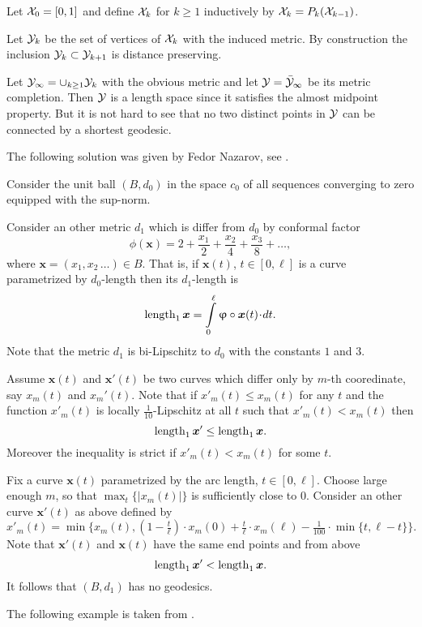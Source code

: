 Let $\mathcal{X}_0=[0,1]$ and define $\mathcal{X}_k$ for $k\ge 1$ inductively by $\mathcal{X}_k=P_k(\mathcal{X}_{k-1})$.

Let $\mathcal{Y}_k$ be the set of vertices of $\mathcal{X}_k$ with the induced metric. By construction the inclusion $\spc{Y}_k\subset \spc{Y}_{k+1}$ is distance preserving.

Let $\spc{Y}_\infty=\cup_{k\ge 1}\spc{Y}_k$ with the obvious metric and let $\mathcal{Y}=\bar {\mathcal{Y}}_\infty$ be its metric completion. Then $\mathcal{Y}$ is a length space since it satisfies the almost midpoint property. But it is not hard to see that no two distinct points in $\mathcal{Y}$ can be connected by a shortest geodesic. \qeds


The following solution was given by Fedor Nazarov, see \cite{nazarov}.

Consider the unit ball $(B,d_0)$
in the space $c_0$ of all sequences converging to zero equipped with the sup-norm.

Consider an other metric $d_1$ which is differ from $d_0$ by conformal factor
\[\phi(\bm{x})={2+\frac{x_1}2+\frac{x_2}4+\frac{x_3}8+\dots},\]
where $\bm{x}=(x_1,x_2\,\dots)\in B$.
That is, if $\bm{x}(t)$, $t\in[0,\ell]$ is a curve parametrized by $d_0$-length 
then its $d_1$-length is 
\[\length_1\bm{x}=\int\limits_0^\ell\phi\circ\bm{x}(t)\cdot dt.\]
Note that the metric $d_1$ is bi-Lipschitz to $d_0$ with the constants $1$ and $3$.

Assume $\bm{x}(t)$ and $\bm{x}'(t)$ be two curves which differ only by $m$-th cooredinate, say $x_m(t)$ and $x_m'(t)$.
Note that if $x'_m(t)\le x_m(t)$ for any $t$ and 
the function $x'_m(t)$ is locally $\tfrac1{10}$-Lipschitz at all $t$ such that $x'_m(t)< x_m(t)$ then 
\[\length_1\bm{x}'\le \length_1\bm{x}.\]
Moreover the inequality is strict if $x'_m(t)< x_m(t)$ for some $t$.

Fix a curve $\bm{x}(t)$ parametrized by the arc length, $t\in[0,\ell]$.
Choose large enough $m$,
so that $\max_t\{|x_m(t)|\}$ is sufficiently close to $0$.
Consider an other curve $\bm{x}'(t)$ as above defined by
\[x'_m(t)=\min\{x_m(t),(1-\tfrac t\ell)\cdot x_m(0)
+\tfrac t\ell\cdot x_m(\ell)
-\tfrac 1{100}\cdot \min\{t,\ell-t\}\}.\]
Note that $\bm{x}'(t)$ and $\bm{x}(t)$ have the same end points and from above 
\[\mathop{\rm length}\nolimits_1\bm{x}'<\mathop{\rm length}\nolimits_1\bm{x}.\]
It follows that $(B,d_1)$ has no geodesics.
\qeds

The following example is taken from \cite{BH}.

\medskip


